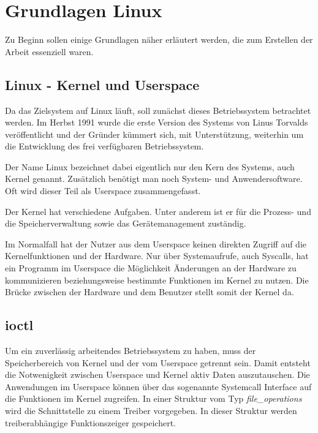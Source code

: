 \chapter{Grundlagen Linux} \label{sec:grund}
Zu Beginn sollen einige Grundlagen näher erläutert werden, die zum Erstellen der Arbeit essenziell waren.

\section{Linux - Kernel und Userspace}\label{sec:linux}
Da das Zielsystem auf Linux läuft, soll zunächst dieses Betriebssystem betrachtet werden. 
Im Herbst 1991 wurde die erste Version des Systems von Linus Torvalds veröffentlicht und der Gründer kümmert sich, mit Unterstützung, weiterhin um die Entwicklung des frei verfügbaren Betriebssystem. %
 
Der Name Linux bezeichnet dabei eigentlich nur den Kern des Systems, auch Kernel genannt. Zusätzlich benötigt man noch System- und Anwendersoftware. Oft wird dieser Teil als Userspace zusammengefasst. \citep[S. 46]{plotner2012linux} 

Der Kernel hat verschiedene Aufgaben. Unter anderem ist er für die Prozess- und die Speicherverwaltung sowie das Gerätemanagement zuständig. \citep[S. 234]{schroder2009embedded} 

Im Normalfall hat der Nutzer aus dem Userspace keinen direkten Zugriff auf die Kernelfunktionen und der Hardware. Nur über Systemaufrufe, auch Syscalls, hat ein Programm im Userspace die Möglichkeit Änderungen an der Hardware zu kommunizieren beziehungsweise bestimmte Funktionen im Kernel zu nutzen. \citep[S. 124]{plotner2012linux} 
Die Brücke zwischen der Hardware und dem Benutzer stellt somit der Kernel da.


\section{\acl{ioctl}}\label{sec:ioctl_t}
Um ein zuverlässig arbeitendes Betriebssystem zu haben, muss der Speicherbereich von Kernel und der vom Userspace getrennt sein. \citep[S. 232]{schroder2009embedded}
Damit entsteht die Notwenigkeit zwischen Userspace und Kernel aktiv Daten auszutauschen. Die Anwendungen im Userspace können über das sogenannte Systemcall Interface auf die Funktionen im Kernel zugreifen. In einer Struktur vom Typ \textit{file\_operations} wird die Schnittstelle zu einem Treiber vorgegeben. In dieser Struktur werden treiberabhängige Funktionszeiger gespeichert. \citep[S. 249]{schroder2009embedded}


